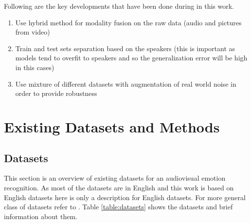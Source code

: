 \documentclass[oneside]{report}
\begin{document}
    
    Following are the key developments that have been done during in this work.
    
    \begin{enumerate}
        \item Use hybrid method for modality fusion on the raw data (audio and pictures from video)
        \item Train and test sets separation based on the speakers (this is important as models tend to overfit to speakers and so the generalization error will be high in this cases)
        \item Use mixture of different datasets with augmentation of real world noise in order to provide robustness
    \end{enumerate}



\chapter{Existing Datasets and Methods}

\section{Datasets}

    
    This section is an overview of existing datasets for an audiovisual emotion recognition. As most of the datasets are in English and this work is based on English datasets here is only a description for English datasets. For more general class of datasets refer to \cite{google_survey}. Table 
    \ref{table:datasets} shows the datasets and brief information about them.
    
\end{document}
